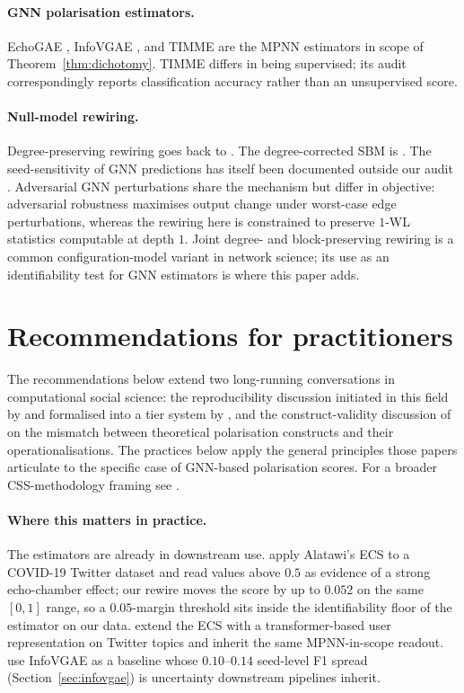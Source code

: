 \documentclass[letterpaper]{article} %
\begin{document}
\paragraph{GNN polarisation estimators.} EchoGAE
\citep{Alatawi23EchoGAE}, InfoVGAE \citep{Li22InfoVGAE}, and
TIMME \citep{XiaoTIMME2020} are the MPNN estimators in scope
of Theorem~\ref{thm:dichotomy}. TIMME differs in being
supervised; its audit correspondingly reports classification
accuracy rather than an unsupervised score.

\paragraph{Null-model rewiring.} Degree-preserving rewiring goes
back to \citet{MolloyReed1995, Newman2001}. The degree-corrected
SBM is \citet{Karrer2011StochasticBlock}. The seed-sensitivity of GNN
predictions has itself been documented outside our audit
\citep{ErricaFair2020}. Adversarial GNN
perturbations \citep{Jin2020, Zugner2018} share the mechanism but
differ in objective: adversarial robustness maximises output
change under worst-case edge perturbations, whereas the rewiring
here is constrained to preserve $1$-WL statistics computable at
depth $1$. Joint degree- and block-preserving rewiring is a
common configuration-model variant in network science; its use
as an identifiability test for GNN estimators is where this
paper adds.

\section{Recommendations for practitioners}\label{sec:recs}

The recommendations below extend two long-running conversations
in computational social science: the reproducibility discussion
initiated in this field by \citet{LazerObstacles2020} and
formalised into a tier system by \citet{Schoch2024Reproducibility},
and the construct-validity discussion of
\citet{JacobsWallach2021} on the mismatch between theoretical
polarisation constructs and their operationalisations. The
practices below apply the general principles those papers
articulate to the specific case of GNN-based polarisation
scores. For a broader CSS-methodology framing see
\citet{Salganik2018BitByBit}.

\paragraph{Where this matters in practice.} The estimators are
already in downstream use. \citet{Riedl2024GermanElection}
apply Alatawi's ECS to a COVID-19 Twitter dataset and read
values above $0.5$ as evidence of a strong echo-chamber
effect; our rewire moves the score by up to $0.052$ on the
same $[0, 1]$ range, so a $0.05$-margin threshold sits inside
the identifiability floor of the estimator on our data.
\citet{Ghafouri2024Transformer} extend the ECS with a
transformer-based user representation on Twitter topics and
inherit the same MPNN-in-scope readout.
\citet{Sun2023Decoding} use InfoVGAE as a baseline whose
$0.10$--$0.14$ seed-level F1 spread (Section~\ref{sec:infovgae})
is uncertainty downstream pipelines inherit.
\end{document}
